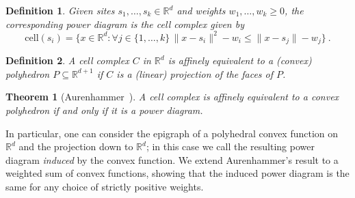 \documentclass[12pt]{article}
\newcommand{\reals}{\mathbb{R}}
\newcommand{\cell}{\mathrm{cell}}
\newtheorem{theorem}{Theorem}
\newtheorem{definition}{Definition}
\begin{document}
\begin{definition}\label{def:power-diagram}
  Given sites $s_1,\ldots,s_k\in\reals^d$ and weights $w_1,\ldots,w_k \geq 0$, the corresponding \emph{power diagram} is the cell complex given by
  \begin{equation}
    \label{eq:pd}
    \cell(s_i) = \{ x \in\reals^d : \forall j \in \{1,\ldots,k\} \, \|x - s_i\|^2 - w_i \leq \|x - s_j\| - w_j\}~.
  \end{equation}
\end{definition}

\begin{definition}\label{def:affine-equiv}
  A cell complex $C$ in $\reals^d$ is \emph{affinely equivalent} to a (convex) polyhedron $P \subseteq \reals^{d+1}$ if $C$ is a (linear) projection of the faces of $P$.
\end{definition}

\begin{theorem}[Aurenhammer~\cite{aurenhammer1987power}]\label{thm:aurenhammer}
  A cell complex is affinely equivalent to a convex polyhedron if and only if it is a power diagram.
\end{theorem}

In particular, one can consider the epigraph of a polyhedral convex function on $\reals^d$ and the projection down to $\reals^d$; in this case we call the resulting power diagram \emph{induced} by the convex function.
We extend Aurenhammer's result to a weighted sum of convex functions, showing that the induced power diagram is the same for any choice of strictly positive weights.
\end{document}
